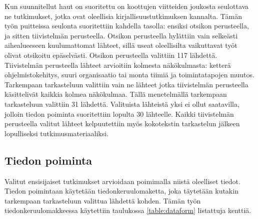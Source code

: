 Kun suunnitellut haut on suoritettu on koottujen viitteiden joukosta seulottava
ne tutkimukset, jotka ovat oleellisia kirjallisuustutkimuksen kannalta. Tämän
työn puitteissa seulonta suoritettiin kahdella tasolla: ensiksi otsikon
perusteella, ja sitten tiivistelmän perusteella. Otsikon perusteella hylättiin
vain selkeästi aihealueeseen kuulumattomat lähteet, sillä useat oleellisilta
vaikuttavat työt olivat otsikoitu epäselvästi. Otsikon perusteella valittiin 117
lähdettä. Tiivistelmän perusteella lähteet arvioitiin kolmesta näkökulmasta:
ketterä ohjelmistokehitys, suuri organisaatio tai monta tiimiä ja
toimintatapojen muutos. Tarkempaan tarkasteluun valittiin vain ne lähteet jotka
tiivistelmän perusteella käsittelivät kaikkia kolmea näkökulmaa. Tällä
menetelmällä tarkempaan tarkasteluun valittiin 31 lähdettä. Valituista lähteistä
yksi ei ollut saatavilla, jolloin tiedon poiminta suoritettiin lopulta 30
lähteelle. Kaikki tiivistelmän perusteella valitut lähteet kelpuutettiin
myös kokotekstin tarkastelun jälkeen lopulliseksi tutkimusmateriaaliksi.


\subsection{Tiedon poiminta}

Valitut ensisijaiset tutkimukset arvioidaan poimimalla niistä oleelliset tiedot.
Tiedon poimintaan käytetään tiedonkeruulomaketta, joka täytetään kutakin
tarkempaan tarkasteluun valittua lähdettä kohden. Tämän työn
tiedonkeruulomakkeessa käytettiin taulukossa \ref{table:dataform} listattuja
kenttiä.


